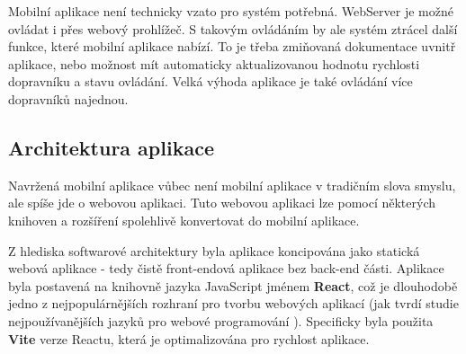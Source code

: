 Mobilní aplikace není technicky vzato pro systém potřebná. WebServer je možné ovládat i přes webový prohlížeč. S takovým ovládáním by ale systém ztrácel další funkce, které mobilní aplikace nabízí. To je třeba zmiňovaná dokumentace uvnitř aplikace, nebo možnost mít automaticky aktualizovanou hodnotu rychlosti dopravníku a stavu ovládání. Velká výhoda aplikace je také ovládání více dopravníků najednou.

\subsection{Architektura aplikace}

Navržená mobilní aplikace vůbec není mobilní aplikace v tradičním slova smyslu, ale spíše jde o webovou aplikaci. Tuto webovou aplikaci lze pomocí některých knihoven a rozšíření spolehlivě konvertovat do mobilní aplikace.




Z hlediska softwarové architektury byla aplikace koncipována jako statická webová aplikace - tedy čistě front-endová aplikace bez back-end části. Aplikace byla postavená na knihovně jazyka JavaScript jménem \textbf{React}, což je dlouhodobě jedno z nejpopulárnějších rozhraní pro tvorbu webových aplikací (jak tvrdí studie nejpoužívanějších jazyků pro webové programování \cite{ReactWebDeveloperPopularity}). Specificky byla použita \textbf{Vite} verze Reactu, která je optimalizována pro rychlost aplikace.
\cite{ViteReactWeb}

